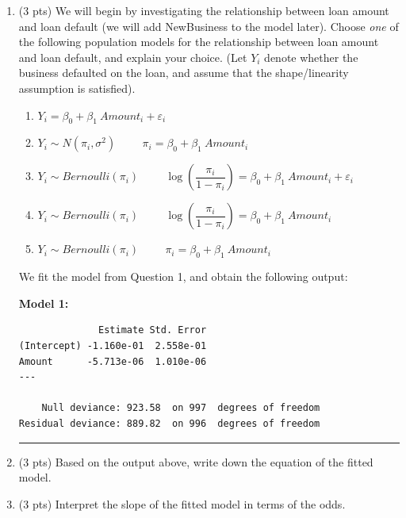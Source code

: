 \documentclass[11pt]{article}
\begin{document}
\begin{enumerate}

\item (3 pts) We will begin by investigating the relationship between loan amount and loan default (we will add NewBusiness to the model later). Choose \textit{one} of the following population models for the relationship between loan amount and loan default, and explain your choice. (Let $Y_i$ denote whether the business defaulted on the loan, and assume that the shape/linearity assumption is satisfied).

\begin{enumerate}
\item $Y_i = \beta_0 + \beta_1 \ Amount_i + \varepsilon_i$
\item $Y_i \sim N(\pi_i, \sigma^2) \hspace{1cm} \pi_i = \beta_0 + \beta_1 \ Amount_i$
\item $Y_i \sim Bernoulli(\pi_i) \hspace{1cm} \log \left( \dfrac{\pi_i}{1 - \pi_i} \right) = \beta_0 + \beta_1 \ Amount_i + \varepsilon_i$
\item $Y_i \sim Bernoulli(\pi_i) \hspace{1cm} \log \left( \dfrac{\pi_i}{1 - \pi_i} \right) = \beta_0 + \beta_1 \ Amount_i$
\item $Y_i \sim Bernoulli(\pi_i) \hspace{1cm} \pi_i = \beta_0 + \beta_1 \ Amount_i$
\end{enumerate}



\newpage


We fit the model from Question 1, and obtain the following output:

\textbf{Model 1:}

\begin{verbatim}
              Estimate Std. Error 
(Intercept) -1.160e-01  2.558e-01
Amount      -5.713e-06  1.010e-06 
---

    Null deviance: 923.58  on 997  degrees of freedom
Residual deviance: 889.82  on 996  degrees of freedom
\end{verbatim}

\rule{\textwidth}{1pt}

\item (3 pts) Based on the output above, write down the equation of the fitted model.

\vspace{3cm}

\item (3 pts) Interpret the slope of the fitted model in terms of the odds.


\end{enumerate}
\end{document}
